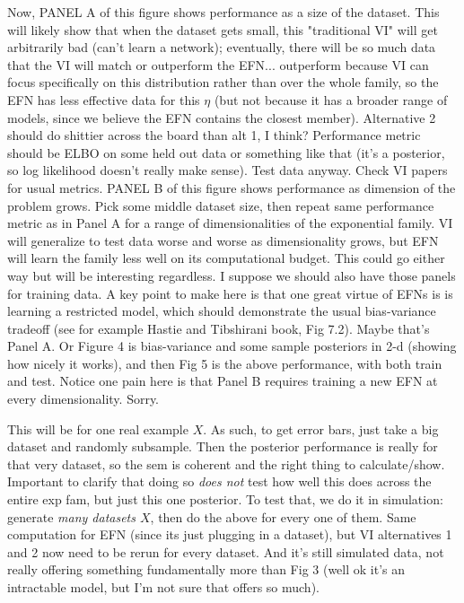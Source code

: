 \documentclass{article}
\begin{document}
Now, PANEL A of this figure shows performance as a size of the dataset.  This will likely show that when the dataset gets small, this "traditional VI" will get arbitrarily bad (can't learn a network); eventually, there will be so much data that the VI will match or outperform the EFN... outperform because VI can focus specifically on this distribution rather than over the whole family, so the EFN has less effective data for this $\eta$ (but not because it has a broader range of models, since we believe the EFN contains the closest member).  Alternative 2 should do shittier across the board than alt 1, I think?   Performance metric should be ELBO on some held out data or something like that (it's a posterior, so log likelihood doesn't really make sense).  Test data anyway.   Check VI papers for usual metrics.  PANEL B of this figure shows performance as dimension of the problem grows.  Pick some middle dataset size, then repeat same performance metric as in Panel A for a range of dimensionalities of the exponential family.   VI will generalize to test data worse and worse as dimensionality grows, but EFN will learn the family less well on its computational budget.  This could go either way but will be interesting regardless.  I suppose we should also have those panels for training data.   A key point to make here is that one great virtue of EFNs is is learning a restricted model, which should demonstrate the usual bias-variance tradeoff (see for example Hastie and Tibshirani book, Fig 7.2).  Maybe that's Panel A.  Or Figure 4 is bias-variance and some sample posteriors in 2-d (showing how nicely it works), and then Fig 5 is the above performance, with both train and test.   Notice one pain here is that Panel B requires training a new EFN at every dimensionality.  Sorry.

This will be for one real example $X$.  As such, to get error bars, just take a big dataset and randomly subsample.  Then the posterior performance is really for that very dataset, so the sem is coherent and the right thing to calculate/show.  Important to clarify that doing so \emph{does not} test how well this does across the entire exp fam, but just this one posterior.  To test that, we do it in simulation: generate \emph{many datasets $X$}, then do the above for every one of them.  Same computation for EFN (since its just plugging in a dataset), but VI alternatives 1 and 2 now need to be rerun for every dataset.  And it's still simulated data, not really offering something fundamentally more than Fig 3 (well ok it's an intractable model, but I'm not sure that offers so much).
\end{document}
